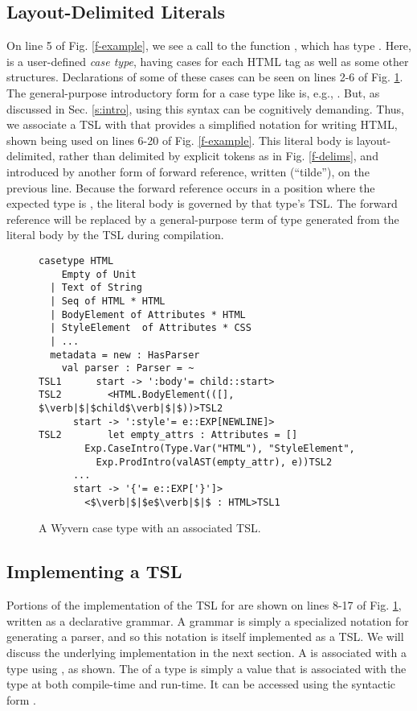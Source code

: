 \subsection{Layout-Delimited Literals}
On line 5 of Fig. \ref{f-example}, we see a call to the function , which has type . Here,  is a user-defined \emph{case type}, having cases for each HTML tag as well as some other structures. Declarations  of some of these cases can be seen on lines 2-6 of Fig. \ref{f-htmltype}. The general-purpose introductory form for a case type like  is, e.g., . But, as discussed in Sec. \ref{s:intro}, using this syntax can be cognitively demanding. Thus, we associate a TSL with  that provides a simplified notation for writing HTML, shown being used on lines 6-20 of Fig. \ref{f-example}. This literal body is layout-delimited, rather than delimited by explicit tokens as in Fig. \ref{f-delims}, and introduced by another form of forward reference, written \li{~} (``tilde''), on the previous line. Because the forward reference occurs in a position where the expected type is , the literal body is governed by that type's TSL. The forward reference will be replaced by a general-purpose term of type  generated from the literal body by the TSL during compilation.
\begin{figure}[t]
\begin{lstlisting}[escapechar=$]
casetype HTML 
    Empty of Unit
  | Text of String
  | Seq of HTML * HTML 
  | BodyElement of Attributes * HTML
  | StyleElement  of Attributes * CSS
  | ...
  metadata = new : HasParser
    val parser : Parser = ~
TSL1      start -> ':body'= child::start>
TSL2        <HTML.BodyElement(([], $\verb|$|$child$\verb|$|$))>TSL2
      start -> ':style'= e::EXP[NEWLINE]>
TSL2        let empty_attrs : Attributes = []
        Exp.CaseIntro(Type.Var("HTML"), "StyleElement",
          Exp.ProdIntro(valAST(empty_attr), e))TSL2
      ...
      start -> '{'= e::EXP['}']>
        <$\verb|$|$e$\verb|$|$ : HTML>TSL1
\end{lstlisting}
\vspace{-8px}
\caption{A Wyvern case type with an associated TSL.}
\vspace{-10px}
\label{f-htmltype}
\end{figure}

\subsection{Implementing a TSL}
Portions of the implementation of the TSL for  are shown on lines 8-17 of Fig. \ref{f-htmltype}, written as a declarative grammar. A grammar is simply a specialized notation for generating a parser, and so this notation is itself implemented as a TSL. We will discuss the underlying implementation in the next section. A  is associated with a type using , as shown. The  of a type  is simply a value that is associated with the type at both compile-time and run-time. It can be accessed using the syntactic form .

